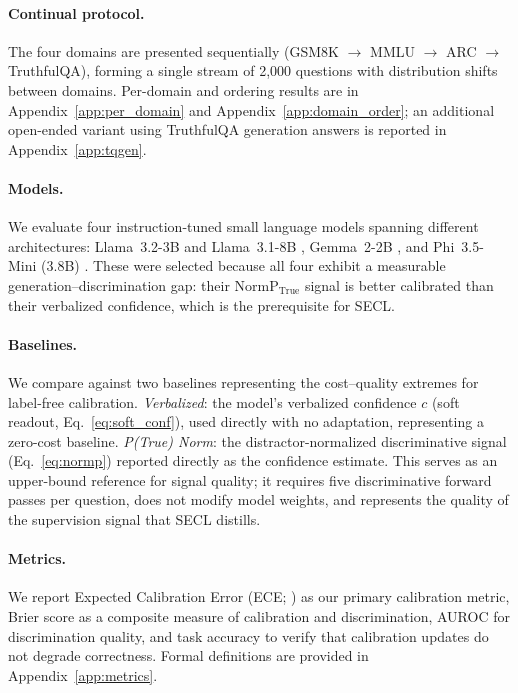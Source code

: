 \documentclass[11pt]{article}
\begin{document}
\paragraph{Continual protocol.}
The four domains are presented sequentially (GSM8K $\to$ MMLU $\to$ ARC $\to$ TruthfulQA), forming a single stream of 2{,}000 questions with distribution shifts between domains. Per-domain and ordering results are in Appendix~\ref{app:per_domain} and Appendix~\ref{app:domain_order}; an additional open-ended variant using TruthfulQA generation answers is reported in Appendix~\ref{app:tqgen}.

\paragraph{Models.}
We evaluate four instruction-tuned small language models spanning different architectures: Llama~3.2-3B and Llama~3.1-8B \cite{grattafiori_llama_2024}, Gemma~2-2B \cite{team_gemma_2024}, and Phi~3.5-Mini (3.8B) \cite{abdin_phi3_2024}. These were selected because all four exhibit a measurable generation--discrimination gap: their $\text{NormP}_{\text{True}}$ signal is better calibrated than their verbalized confidence, which is the prerequisite for SECL.

\paragraph{Baselines.}
We compare against two baselines representing the cost–quality extremes for label-free calibration.
\emph{Verbalized}: the model's verbalized confidence $c$ (soft readout, Eq.~\ref{eq:soft_conf}), used directly with no adaptation, representing a zero-cost baseline.
\emph{P(True) Norm}: the distractor-normalized discriminative signal (Eq.~\ref{eq:normp}) reported directly as the confidence estimate. This serves as an upper-bound reference for signal quality; it requires five discriminative forward passes per question, does not modify model weights, and represents the quality of the supervision signal that SECL distills.

\paragraph{Metrics.}
We report Expected Calibration Error (ECE; \citealt{naeini_obtaining_2015, guo_calibration_2017}) as our primary calibration metric, Brier score \cite{brier_verification_1950} as a composite measure of calibration and discrimination, AUROC for discrimination quality, and task accuracy to verify that calibration updates do not degrade correctness. Formal definitions are provided in Appendix~\ref{app:metrics}.
\end{document}
